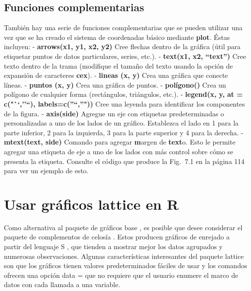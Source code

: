 \documentclass[
]{book}
\begin{document}
\hypertarget{funciones-complementarias}{%
\subsection*{Funciones complementarias}\label{funciones-complementarias}}

También hay una serie de funciones complementarias que se pueden utilizar una vez que se ha creado el sistema de coordenadas básico mediante \textbf{plot}. Éstas incluyen:
- \textbf{arrows(x1, y1, x2, y2)} Cree flechas dentro de la gráfica (útil para etiquetar puntos de datos particulares, series, etc.).
- \textbf{text(x1, x2, ``text'')} Cree texto dentro de la trama (modifique el tamaño del texto usando la opción de expansión de caracteres \textbf{cex}).
- \textbf{lineas (x, y)} Crea una gráfica que conecte líneas.
- \textbf{puntos (x, y)} Crea una gráfica de puntos.
- \textbf{polígono()} Crea un polígono de cualquier forma (rectángulos, triángulos, etc.).
- \textbf{legend(x, y, at = c("``,''``), labels=c(''``,''"))} Cree una leyenda para identificar los componentes de la figura.
- \textbf{axis(side)} Agregue un eje con etiquetas predeterminadas o personalizadas a uno de los lados de un gráfico. Establezca el lado en 1 para la parte inferior, 2 para la izquierda, 3 para la parte superior y 4 para la derecha.
- \textbf{mtext(text, side)} Comando para agregar \textbf{m}argen de \textbf{text}o. Esto le permite agregar una etiqueta de eje a uno de los lados con más control sobre cómo se presenta la etiqueta. Consulte el código que produce la Fig.  7.1 en la página 114 para ver un ejemplo de esto.

\hypertarget{usar-gruxe1ficos-lattice-en-r}{%
\section*{\texorpdfstring{Usar gráficos \textbf{lattice} en R}{Usar gráficos lattice en R}}\label{usar-gruxe1ficos-lattice-en-r}}

Como alternativa al paquete de gráficos base , es posible que desee considerar el paquete de complementos de celosía . Estos producen gráficos de enrejado a partir del lenguaje S , que tienden a mostrar mejor los datos agrupados y numerosas observaciones. Algunas características interesantes del paquete lattice son que los gráficos tienen valores predeterminados fáciles de usar y los comandos ofrecen una opción data = que no requiere que el usuario enumere el marco de datos con cada llamada a una variable.
\end{document}

